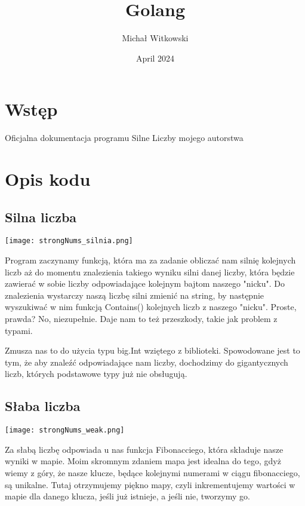\documentclass{article}
\title{Golang}
\author{Michał Witkowski}
\date{April 2024}
\begin{document}
\maketitle

\section{Wstęp}

\vspace{1em}

Oficjalna dokumentacja programu Silne Liczby mojego autorstwa


\section{Opis kodu}

\subsection{Silna liczba}

\texttt{[image: strongNums\_silnia.png]}

\vspace{2em}
Program zaczynamy funkcją, która ma za zadanie obliczać nam silnię kolejnych liczb aż do momentu znalezienia takiego wyniku silni danej liczby, która będzie zawierać w sobie liczby odpowiadające kolejnym bajtom naszego "nicku". Do znalezienia wystarczy naszą liczbę silni zmienić na string, by następnie wyszukiwać w nim funkcją Contains() kolejnych liczb z naszego "nicku". Proste, prawda? No, niezupełnie. Daje nam to też przeszkody, takie jak problem z typami.

\vspace{1em}

Zmusza nas to do użycia typu big.Int wziętego z biblioteki. Spowodowane jest to tym, że aby znaleźć odpowiadające nam liczby, dochodzimy do gigantycznych liczb, których podstawowe typy już nie obsługują.


\subsection{Słaba liczba}

\texttt{[image: strongNums\_weak.png]}

\vspace{3em}

Za słabą liczbę odpowiada u nas funkcja Fibonacciego, która składuje nasze wyniki w mapie. Moim skromnym zdaniem mapa jest idealna do tego, gdyż wiemy z góry, że nasze klucze, będące kolejnymi numerami w ciągu fibonacciego, są unikalne. Tutaj otrzymujemy piękno mapy, czyli inkrementujemy wartości w mapie dla danego klucza, jeśli już istnieje, a jeśli nie, tworzymy go.
\end{document}
